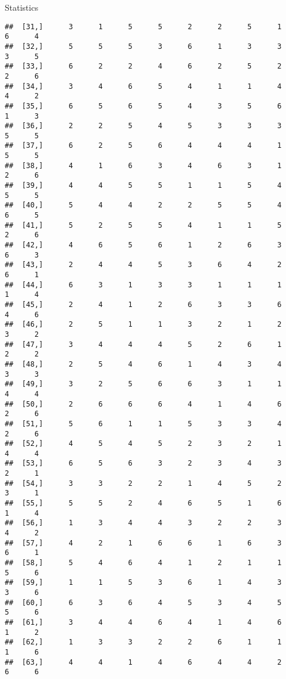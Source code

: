 \documentclass[
  ignorenonframetext,
]{beamer}
\begin{document}
\begin{frame}[fragile]{Statistics}
\begin{verbatim}
##  [31,]      3      1      5      5      2      2      5      1      6      4
##  [32,]      5      5      5      3      6      1      3      3      3      5
##  [33,]      6      2      2      4      6      2      5      2      2      6
##  [34,]      3      4      6      5      4      1      1      4      4      2
##  [35,]      6      5      6      5      4      3      5      6      1      3
##  [36,]      2      2      5      4      5      3      3      3      5      5
##  [37,]      6      2      5      6      4      4      4      1      5      5
##  [38,]      4      1      6      3      4      6      3      1      2      6
##  [39,]      4      4      5      5      1      1      5      4      5      5
##  [40,]      5      4      4      2      2      5      5      4      6      5
##  [41,]      5      2      5      5      4      1      1      5      2      6
##  [42,]      4      6      5      6      1      2      6      3      6      3
##  [43,]      2      4      4      5      3      6      4      2      6      1
##  [44,]      6      3      1      3      3      1      1      1      1      4
##  [45,]      2      4      1      2      6      3      3      6      4      6
##  [46,]      2      5      1      1      3      2      1      2      3      2
##  [47,]      3      4      4      4      5      2      6      1      2      2
##  [48,]      2      5      4      6      1      4      3      4      3      3
##  [49,]      3      2      5      6      6      3      1      1      4      4
##  [50,]      2      6      6      6      4      1      4      6      2      6
##  [51,]      5      6      1      1      5      3      3      4      2      6
##  [52,]      4      5      4      5      2      3      2      1      4      4
##  [53,]      6      5      6      3      2      3      4      3      2      1
##  [54,]      3      3      2      2      1      4      5      2      3      1
##  [55,]      5      5      2      4      6      5      1      6      1      4
##  [56,]      1      3      4      4      3      2      2      3      4      2
##  [57,]      4      2      1      6      6      1      6      3      6      1
##  [58,]      5      4      6      4      1      2      1      1      5      6
##  [59,]      1      1      5      3      6      1      4      3      3      6
##  [60,]      6      3      6      4      5      3      4      5      5      6
##  [61,]      3      4      4      6      4      1      4      6      1      2
##  [62,]      1      3      3      2      2      6      1      1      1      6
##  [63,]      4      4      1      4      6      4      4      2      6      6

\end{verbatim}
\end{frame}
\end{document}
